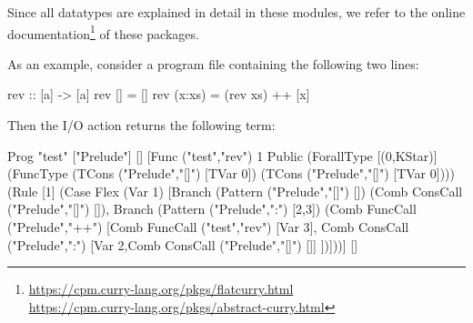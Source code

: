 {Since all datatypes are explained in detail in these modules,
we refer to the online documentation\footnote{%
\url{https://cpm.curry-lang.org/pkgs/flatcurry.html}\\
\url{https://cpm.curry-lang.org/pkgs/abstract-curry.html}}
of these packages.

As an example, consider a program file 
containing the following two lines:
\begin{curry}
rev :: [a] -> [a]
rev []     = []
rev (x:xs) = (rev xs) ++ [x]
\end{curry}
Then the I/O action  returns the
following term:
\begin{curry}
Prog "test"
  ["Prelude"]
  []
  [Func ("test","rev") 1 Public
    (ForallType [(0,KStar)] (FuncType (TCons ("Prelude","[]") [TVar 0])
                                      (TCons ("Prelude","[]") [TVar 0])))
    (Rule [1]
       (Case Flex (Var 1)
          [Branch (Pattern ("Prelude","[]") [])
             (Comb ConsCall ("Prelude","[]") []),
           Branch (Pattern ("Prelude",":") [2,3])
             (Comb FuncCall ("Prelude","++")
                   [Comb FuncCall ("test","rev") [Var 3],
                    Comb ConsCall ("Prelude",":")
                         [Var 2,Comb ConsCall ("Prelude","[]") []]
                   ])]))]
  []
\end{curry}


\newpage


}
